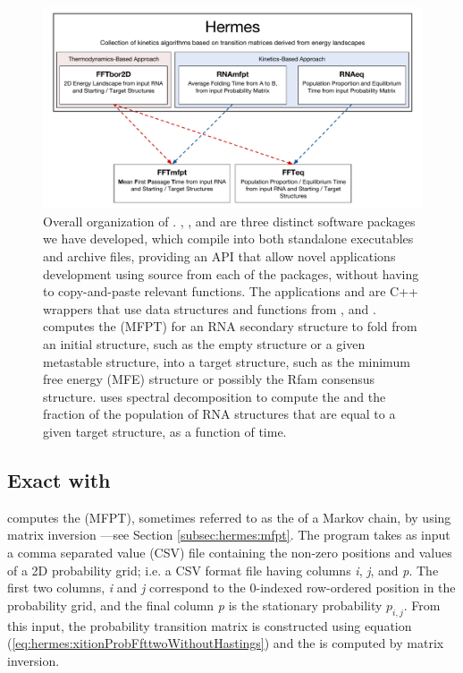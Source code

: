 \begin{figure}[!ht]
\centering
\includegraphics[width=.9\textwidth]{Figures/Hermes/softwareOrg.pdf}
\caption{Overall organization of
\hermes. \ffttwo, \rnamfpt, and \rnaeq are three distinct software
packages we have developed, which compile into both standalone
executables and archive files, providing an API that allow novel
applications development using source from each of the packages,
without having to copy-and-paste relevant functions. The applications
\fftmfpt and \ffteq are C++ wrappers that use data structures and functions from
\ffttwo, \rnamfpt and \rnaeq. \fftmfpt computes the
\mfpt (MFPT) for an RNA secondary structure to fold from an
initial structure, such as the empty structure or a given metastable
structure, into a target structure, such as the minimum free energy
(MFE) structure or possibly the Rfam \cite{Gardner.nar11} consensus
structure. \ffteq uses spectral decomposition to compute the \eqt and the
fraction of the population of RNA structures that are
equal to a given target structure, as a function of time.
}
\label{fig:hermes:organizationHermes}
\end{figure}

\subsection{Exact \mfpt with \rnamfpt}
\label{subsec:hermes:rnamfpt}

\rnamfpt computes the \mfpt (MFPT), sometimes
referred to as the \hit of a Markov chain, by using
matrix inversion \cite{meyermfpt}---see
Section \ref{subsec:hermes:mfpt}. The program takes as input a
comma separated value (CSV) file containing the non-zero positions and
values of a 2D probability grid; i.e. a CSV format file having columns {\em i},
{\em j}, and {\em p}. The first two columns, {\em i} and {\em j}
correspond to the 0-indexed row-ordered position in the probability grid, and
the final column {\em p} is the stationary probability $p_{i,j}$.
From this input, the probability transition matrix is constructed using
equation (\ref{eq:hermes:xitionProbFfttwoWithoutHastings}) and the
\mfpt is computed by matrix inversion.

